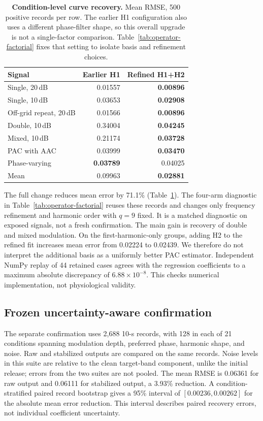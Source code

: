\documentclass[10pt,twocolumn,letterpaper]{article}
\newcommand{\TableStyle}{\fontsize{8}{9.5}\selectfont\setlength{\tabcolsep}{3pt}\renewcommand{\arraystretch}{1.10}}
\begin{document}
\begin{table}[t]
\centering\TableStyle
\caption{\textbf{Condition-level curve recovery.} Mean RMSE, 500
positive records per row. The earlier H1 configuration also uses a
different phase-filter shape, so this overall upgrade is not a
single-factor comparison. Table~\ref{tab:operator-factorial} fixes that
setting to isolate basis and refinement choices.}
\label{tab:operator-conditions}
\begin{tabular*}{\linewidth}{@{\extracolsep{\fill}}lrr@{}}
\toprule
Signal & Earlier H1 & Refined H1+H2\\
\midrule
Single, 20\,dB & 0.01557 & \textbf{0.00896}\\
Single, 10\,dB & 0.03653 & \textbf{0.02908}\\
Off-grid repeat, 20\,dB & 0.01566 & \textbf{0.00896}\\
Double, 10\,dB & 0.34004 & \textbf{0.04245}\\
Mixed, 10\,dB & 0.21174 & \textbf{0.03728}\\
PAC with AAC & 0.03999 & \textbf{0.03470}\\
Phase-varying & \textbf{0.03789} & 0.04025\\
\midrule
Mean & 0.09963 & \textbf{0.02881}\\
\bottomrule
\end{tabular*}
\end{table}

The full change reduces mean error by 71.1\%
(Table~\ref{tab:operator-conditions}). The four-arm diagnostic in
Table~\ref{tab:operator-factorial} reuses these records and changes
only frequency refinement and harmonic order with $q=9$ fixed.
It is a matched diagnostic on exposed signals, not a fresh confirmation.
The main gain is recovery of double and mixed modulation. On the
first-harmonic-only groups, adding H2 to the refined fit increases
mean error from 0.02224 to 0.02439. We therefore do not interpret
the additional basis as a uniformly better PAC estimator. Independent
NumPy replay of 44 retained cases agrees with the regression
coefficients to a maximum absolute discrepancy of $6.88\times10^{-8}$.
This checks numerical implementation, not physiological validity.

\subsection{Frozen uncertainty-aware confirmation}
The separate confirmation uses 2,688 10-s records, with 128 in each of
21 conditions spanning modulation depth, preferred phase, harmonic
shape, and noise. Raw and stabilized outputs are compared on the
same records. Noise levels in this suite are relative to the clean
target-band component, unlike the initial release; errors from the two
suites are not pooled. The mean RMSE is 0.06361 for raw output and
0.06111 for stabilized output, a 3.93\% reduction. A condition-stratified
paired record bootstrap gives a 95\% interval of
$[0.00236,0.00262]$ for the absolute mean error reduction.
This interval describes paired recovery errors, not individual
coefficient uncertainty.
\end{document}
